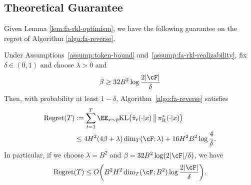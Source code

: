 \documentclass[11pt]{article}
\newcommand{\KL}{\text{KL}}
\newcommand{\pir}{\pi_{\mathrm{R}}}
\begin{document}
\subsection{Theoretical Guarantee}
Given Lemma \ref{lem:fa-rkl-optimism}, we have the following guarantee on the regret of Algorithm \ref{algo:fa-reverse}.
\begin{theorem}
\label{thm:fa-rkl-regret}
Under Assumptions~\ref{assump:token-bound}
and~\ref{assump:fa-rkl-realizability}, fix $\delta\in(0,1)$
and choose $\lambda > 0$ and
\begin{align*}
    \beta
    \ge
    32B^2\log\frac{2|\cF|}{\delta}
\end{align*}
Then, with probability at least $1-\delta$,
Algorithm~\ref{algo:fa-reverse} satisfies
\begin{align}
    \operatorname{Regret}(T)
    &:=
    \sum_{t=1}^T
    \EE_{x\sim\bar\rho}
    \KL\bigl(
        \hat\pi_t(\cdot|x)
        \,\big\|\,
        \pir^*(\cdot|x)
    \bigr)
    \notag\\
    &\leq
    4H^2(4\beta+\lambda)
    \dim_T(\cF;\lambda)
    +
    16H^2B^2\log\frac4\delta.
    \notag
\end{align}
In particular, if we choose $\lambda=B^2$ and $\beta=32B^2\log(2|\cF|/\delta)$, we have
\begin{align*}
    \operatorname{Regret}(T)
    \leq
    O\bigg(
        B^2H^2
            \dim_T(\cF;B^2)
            \log\frac{2|\cF|}{\delta}
    \bigg).
\end{align*}
\end{theorem}
\end{document}
